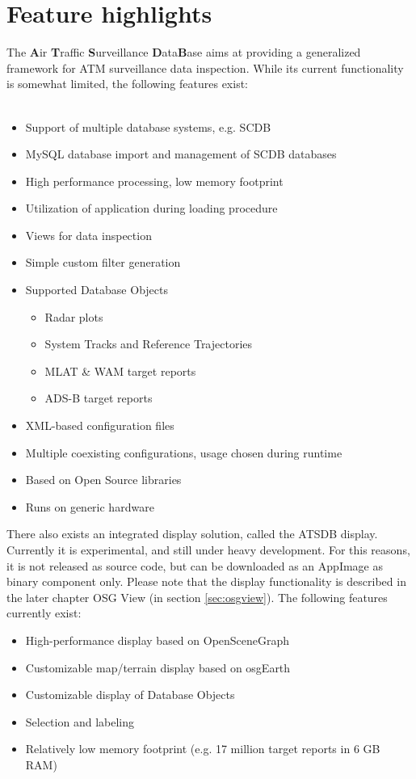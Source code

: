 \documentclass[10pt,letterpaper,extrafontsizes]{memoir}
\begin{document}
\section{Feature highlights}

The \textbf{A}ir \textbf{T}raffic \textbf{S}urveillance \textbf{D}ata\textbf{B}ase aims at providing a generalized framework for ATM surveillance data inspection. While its current functionality is somewhat limited, the following features exist:\\\\

\begin{itemize}  
\item Support of multiple database systems, e.g. SCDB
\item MySQL database import and management of SCDB databases
\item High performance processing, low memory footprint
\item Utilization of application during loading procedure
\item Views for data inspection
\item Simple custom filter generation
\item Supported Database Objects
\begin{itemize}  
\item Radar plots
\item System Tracks and Reference Trajectories
\item MLAT \& WAM target reports
\item ADS-B target reports
\end{itemize}
\item XML-based configuration files
\item Multiple coexisting configurations, usage chosen during runtime
\item Based on Open Source libraries
\item Runs on generic hardware
\end{itemize}

There also exists an integrated display solution, called the ATSDB display. Currently it is experimental, and still under heavy development. For this reasons, it is not released as source code, but can be downloaded as an AppImage as binary component only. Please note that the display functionality is described in the later chapter OSG View (in section \ref{sec:osgview}). The following features currently exist:

\begin{itemize}  
\item High-performance display based on OpenSceneGraph
\item Customizable map/terrain display based on osgEarth
\item Customizable display of Database Objects
\item Selection and labeling
\item Relatively low memory footprint (e.g. 17 million target reports in 6 GB RAM)
\end{itemize}
\end{document}
